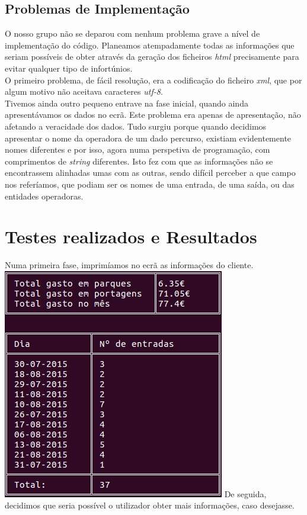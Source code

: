 \documentclass{report}
\begin{document}
\subsection{Problemas de Implementação}
	O nosso grupo não se deparou com nenhum problema grave a nível de implementação do código. Planeamos atempadamente todas as informações que seriam possíveis de obter através da geração dos ficheiros \textit{html} precisamente para evitar qualquer tipo de infortúnios.\\
	O primeiro problema, de fácil resolução, era a codificação do ficheiro \textit{xml}, que por algum motivo não aceitava caracteres \textit{utf-8}.\\
	Tivemos ainda outro pequeno entrave na fase inicial, quando ainda apresentávamos os dados no ecrã. Este problema era apenas de apresentação, não afetando a veracidade dos dados. Tudo surgiu porque quando decidimos apresentar o nome da operadora de um dado percurso, existiam evidentemente nomes diferentes e por isso, agora numa perspetiva de programação, com comprimentos de \textit{string} diferentes. Isto fez com que as informações não se encontrassem alinhadas umas com as outras, sendo difícil perceber a que campo nos referíamos, que podiam ser os nomes de uma entrada, de uma saída, ou das entidades operadoras.\\
\section{Testes realizados e Resultados}
	Numa primeira fase, imprimíamos no ecrã as informações do cliente.\\

\includegraphics[scale=0.4]{terminalV1}
\break
\break
\break
\break
	De seguida, decidimos que seria possível o utilizador obter mais informações, caso desejasse.\\
\end{document}
